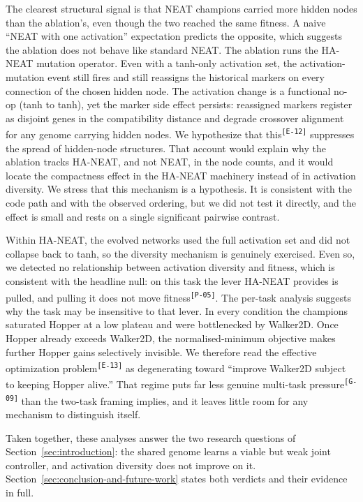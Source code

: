 \documentclass[12pt]{article}
\newcommand{\revID}[1]{\textsuperscript{\scriptsize\texttt{[#1]}}}
\newcommand{\revGram}[2]{\textcolor{lrRed}{#2}\revID{#1}}       %
\newcommand{\revPlain}[2]{\textcolor{lrGreen}{#2}\revID{#1}}    %
\newcommand{\revBrit}[2]{\textcolor{lrBlue}{#2}\revID{#1}}      %
\begin{document}
The clearest structural signal is that NEAT champions carried more hidden nodes than the ablation's, even though the two reached the same fitness.
A naive ``NEAT with one activation'' expectation predicts the opposite, which suggests the ablation does not behave like standard NEAT.
The ablation runs the HA-NEAT mutation operator.
Even with a tanh-only activation set, the activation-mutation event still fires and still reassigns the historical markers on every connection of the chosen hidden node.
The activation change is a functional no-op (tanh to tanh), yet the marker side effect persists: reassigned markers register as disjoint genes in the compatibility distance and degrade crossover alignment for any genome carrying hidden nodes.
\revBrit{E-12}{We hypothesize that this} suppresses the spread of hidden-node structures.
That account would explain why the ablation tracks HA-NEAT, and not NEAT, in the node counts, and it would locate the compactness effect in the HA-NEAT machinery instead of in activation diversity.
We stress that this mechanism is a hypothesis.
It is consistent with the code path and with the observed ordering, but we did not test it directly, and the effect is small and rests on a single significant pairwise contrast.

Within HA-NEAT, the evolved networks used the full activation set and did not collapse back to tanh, so the diversity mechanism is genuinely exercised.
Even so, we detected no relationship between activation diversity and fitness, which is consistent with the headline null: on this task \revPlain{P-05}{the lever HA-NEAT provides is pulled, and pulling it does not move fitness}.
The per-task analysis suggests why the task may be insensitive to that lever.
In every condition the champions saturated Hopper at a low plateau and were bottlenecked by Walker2D.
Once Hopper already exceeds Walker2D, the normalised-minimum objective makes further Hopper gains selectively invisible.
We therefore read \revBrit{E-13}{the effective optimization problem} as degenerating toward ``improve Walker2D subject to keeping Hopper alive.''
\revGram{G-09}{That regime puts far less genuine multi-task pressure} than the two-task framing implies, and it leaves little room for any mechanism to distinguish itself.

Taken together, these analyses answer the two research questions of Section~\ref{sec:introduction}: the shared genome learns a viable but weak joint controller, and activation diversity does not improve on it.
Section~\ref{sec:conclusion-and-future-work} states both verdicts and their evidence in full.
\end{document}
